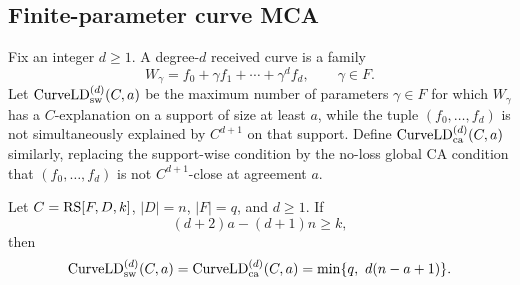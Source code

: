 
\subsection{Finite-parameter curve MCA}

Fix an integer \(d\ge1\).  A degree-\(d\) received curve is a family
\[
  W_\gamma=f_0+\gamma f_1+\cdots+\gamma^d f_d,
  \qquad \gamma\in F .
\]
Let \(\operatorname{CurveLD}_{\rm sw}^{(d)}(C,a)\) be the maximum number of
parameters \(\gamma\in F\) for which \(W_\gamma\) has a \(C\)-explanation on a
support of size at least \(a\), while the tuple \((f_0,\ldots,f_d)\) is not
simultaneously explained by \(C^{d+1}\) on that support.  Define
\(\operatorname{CurveLD}_{\rm ca}^{(d)}(C,a)\) similarly, replacing the
support-wise condition by the no-loss global CA condition that
\((f_0,\ldots,f_d)\) is not \(C^{d+1}\)-close at agreement \(a\).

\begin{theorem}
\label{thm:curve-tangent-staircase}
Let \(C=\operatorname{RS}[F,D,k]\), \(|D|=n\), \(|F|=q\), and \(d\ge1\).  If
\[
  (d+2)a-(d+1)n\ge k,
\]
then
\[
  \operatorname{CurveLD}_{\rm sw}^{(d)}(C,a)
  =
  \operatorname{CurveLD}_{\rm ca}^{(d)}(C,a)
  =
  \min\{q,\ d(n-a+1)\}.
\]
\end{theorem}

